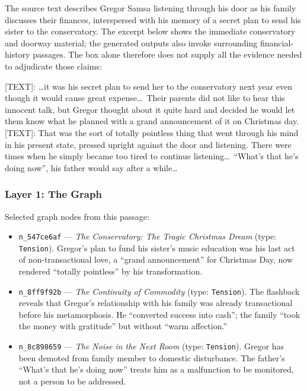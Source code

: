 \documentclass[11pt]{article}
\begin{document}
The source text describes Gregor Samsa listening through his door as his family discusses their finances, interspersed with his memory of a secret plan to send his sister to the conservatory. The excerpt below shows the immediate conservatory and doorway material; the generated outputs also invoke surrounding financial-history passages. The box alone therefore does not supply all the evidence needed to adjudicate those claims:

\begin{metabox}
{[TEXT]}: \textrm{\ldots it was his secret plan to send her to the conservatory next year even though it would cause great expense\ldots\ Their parents did not like to hear this innocent talk, but Gregor thought about it quite hard and decided he would let them know what he planned with a grand announcement of it on Christmas day.}\\[0.5em]
{[TEXT]}: \textrm{That was the sort of totally pointless thing that went through his mind in his present state, pressed upright against the door and listening. There were times when he simply became too tired to continue listening\ldots\ ``What's that he's doing now'', his father would say after a while\ldots}
\end{metabox}

\subsubsection{Layer 1: The Graph}

Selected graph nodes from this passage:

\begin{itemize}
    \item \texttt{n\_547ce6af} --- \emph{The Conservatory: The Tragic Christmas Dream} (type: \texttt{Tension}). Gregor's plan to fund his sister's music education was his last act of non-transactional love, a ``grand announcement'' for Christmas Day, now rendered ``totally pointless'' by his transformation.

    \item \texttt{n\_8ff9f92b} --- \emph{The Continuity of Commodity} (type: \texttt{Tension}). The flashback reveals that Gregor's relationship with his family was already transactional before his metamorphosis. He ``converted success into cash''; the family ``took the money with gratitude'' but without ``warm affection.''

    \item \texttt{n\_8c898659} --- \emph{The Noise in the Next Room} (type: \texttt{Tension}). Gregor has been demoted from family member to domestic disturbance. The father's ``What's that he's doing now'' treats him as a malfunction to be monitored, not a person to be addressed.
\end{itemize}
\end{document}
